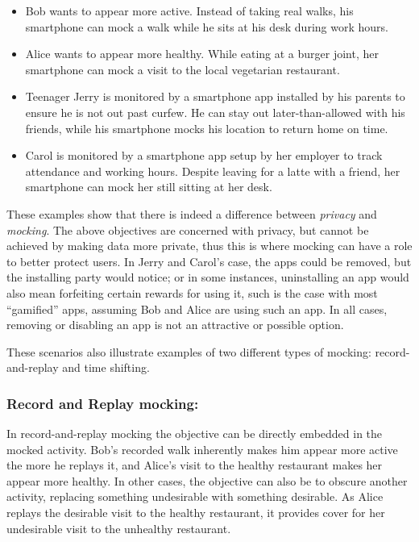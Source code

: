 \begin{itemize}

\item Bob wants to appear more active. Instead of taking real walks, his
smartphone can mock a walk while he sits at his desk during work hours.

\item Alice wants to appear more healthy. While eating at a burger joint, her
smartphone can mock a visit to the local vegetarian restaurant.

\item Teenager Jerry is monitored by a smartphone app installed by his parents
to ensure he is not out past curfew. He can stay out later-than-allowed with
his friends, while his smartphone mocks his location to return home on time.

\item Carol is monitored by a smartphone app setup by her employer to track
attendance and working hours. Despite leaving for a latte with a friend, her
smartphone can mock her still sitting at her desk.

\end{itemize}

These examples show that there is indeed a difference between \textit{privacy}
and \textit{mocking}. The above objectives are concerned with privacy, but
cannot be achieved by making data more private, thus this is where mocking can
have a role to better protect users. In Jerry and Carol's case, the apps could
be removed, but the installing party would notice; or in some instances,
uninstalling an app would also mean forfeiting certain rewards for using it,
such is the case with most ``gamified'' apps, assuming Bob and Alice are using
such an app. In all cases, removing or disabling an app is not an attractive or
possible option.

These scenarios also illustrate examples of two different types of
mocking: record-and-replay and time shifting.

\subsubsection{Record and Replay mocking:\space}

In record-and-replay mocking the objective can be directly embedded in the
mocked activity. Bob's recorded walk inherently makes him appear more active
the more he replays it, and Alice's visit to the healthy restaurant makes her
appear more healthy. In other cases, the objective can also be to obscure
another activity, replacing something undesirable with something desirable.
As Alice replays the desirable visit to the healthy restaurant, it provides
cover for her undesirable visit to the unhealthy restaurant.

